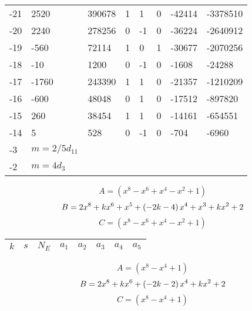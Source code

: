 \documentclass{amsart}
\begin{document}
\begin{longtable}{|l|l|l|lllll|}
-21&2520&390678&1&1&0&-42414&-3378510\\
-20&2240&278256&0&-1&0&-36224&-2640912\\
-19&-560&72114&1&0&1&-30677&-2070256\\
-18&-10&1200&0&-1&0&-1608&-24288\\
-17&-1760&243390&1&1&0&-21357&-1210209\\
-16&-600&48048&0&1&0&-17512&-897820\\
-15&260&38454&1&1&0&-14161&-654551\\
-14&5&528&0&-1&0&-704&-6960\\
-3&$m=2/5d_{11}$&&\multicolumn{5}{c|}{}\\
-2&$m=4d_{3}$&&\multicolumn{5}{c|}{}\\
\hline
\end{longtable}
$$A=(x^8
 - x^6
 + x^4
 - x^2
 + 1)$$
$$B=2\*x^8
 + k\*x^6
 + x^5
 + \left(-2\*k
 - 4\right) \*x^4
 + x^3
 + k\*x^2
 + 2$$
$$C=(x^8
 - x^6
 + x^4
 - x^2
 + 1)$$
\begin{longtable}{|l|l|l|lllll|}
\hline
$k$ & $s$ & $N_E$ & $a_1$ & $a_2$ & $a_3$ & $a_4$ & $a_5$\\
\hline
\hline
\end{longtable}
$$A=(x^8
 - x^4
 + 1)$$
$$B=2\*x^8
 + k\*x^6
 + \left(-2\*k
 - 2\right) \*x^4
 + k\*x^2
 + 2$$
$$C=(x^8
 - x^4
 + 1)$$
\end{document}
